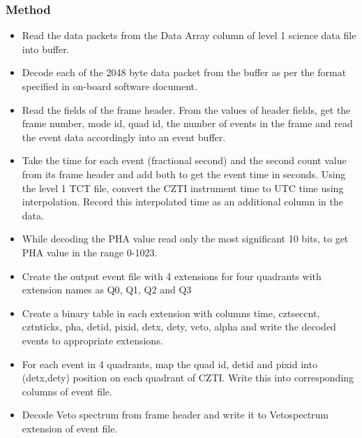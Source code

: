 \documentclass[11pt,oneside,a4paper]{article}
\begin{document}
\subsubsection*{Method}
\begin{itemize}

\item{Read  the  data  packets  from  the  Data Array  column of level 1 science data file into   buffer.}

\item{Decode  each  of  the  2048  byte  data  packet  from  the  buffer  as  per  the  format specified in   
on-board  software document.} 

\item{Read  the  fields  of  the  frame  header.  From  the  values  of  header fields,  get  the  frame  number, 
mode  id,  quad  id,  the  number  of  events  in  the  frame  and  read  the  event  data  accordingly into  an  event  buffer.}

\item{Take  the  time  for  each  event  (fractional  second)  and  the  second  count  value  from  its  frame  
header  and  add  both to  get  the  event  time  in  seconds.  Using  the level 1 TCT  
file,  convert  the  CZTI instrument time  to  UTC  time  using  interpolation.  Record  this  interpolated  time  as  an  
additional  column  in  the  data. }

\item{While decoding the PHA value read only the most significant 10 bits, to get PHA value 
in the range 0-1023.}

\item{Create  the  output  event  file  with  4  extensions  for  four  quadrants  with  extension  names  as  Q0,  
Q1,  Q2 and  Q3}

\item{Create  a  binary  table  in  each  extension  with  columns  time, cztseccnt, cztnticks, pha,  detid,  pixid,
 detx, dety, veto, alpha  and  write  the  decoded events to appropriate extensions.} 

\item{For  each  event  in  4  quadrants,  map  the  quad id, detid  and  pixid  into  (detx,dety)  position 
on each quadrant of CZTI. Write this into corresponding columns of event file.}

\item{Decode Veto spectrum from frame header and write it to Vetospectrum extension of event file.}


\end{itemize}
\end{document}
